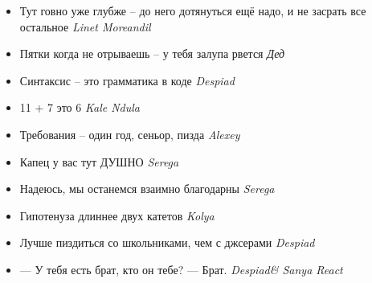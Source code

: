 \documentclass[11pt]{book}
\newcommand{\entry}[2] {\large{\textmd{#1}} \textemdash \small{\emph{#2}}}
\newcommand{\kn}{Kale Ndula}
\newcommand{\lm}{Linet Moreandil}
\newcommand{\dd}{Despiad}
\newcommand{\al}{Alexey}
\newcommand{\se}{Serega}
\newcommand{\nb}{Kolya}
\begin{document}
\begin{itemize}[leftmargin=0cm]
\item \entry{Тут говно уже глубже -- до него дотянуться ещё надо, и не засрать все остальное}{\lm}
\item \entry{Пятки когда не отрываешь -- у тебя залупа рвется}{Дед}
\item \entry{Синтаксис -- это грамматика в коде}{\dd}
\item \entry{11 + 7 это 6}{\kn}
\item \entry{Требования -- один год, сеньор, пизда}{\al}
\item \entry{Капец у вас тут ДУШНО}{\se}
\item \entry{Надеюсь, мы останемся взаимно благодарны}{\se}
\item \entry{Гипотенуза длиннее двух катетов}{\nb}
\item \entry{Лучше пиздиться со школьниками, чем с джсерами}{\dd}
\item \entry{--- У тебя есть брат, кто он тебе? --- Брат.}{\dd \& Sanya React}

\end{itemize}
\end{document}
